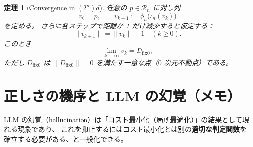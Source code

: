 \documentclass[12pt,a4paper]{article}
\newcommand{\dfix}{D_{\mathrm{fix}0}} %
\newcommand{\Rep}{\mathcal{R}}
\newtheorem{theorem}{定理}[section]
\begin{document}
\begin{theorem}[Convergence in $(2^{n})d$]
任意の $p\in\Rep_{n}$ に対し列
\[
  v_{0}=p,\qquad v_{k+1}:=\phi_{n}\bigl(\iota_{n}(v_{k})\bigr)
\]
を定める。
さらに各ステップで距離が 1 だけ減少すると仮定する：
\[
  \|v_{k+1}\|=\|v_{k}\|-1\quad(k\ge0).
\]
このとき
\[
  \lim_{k\to\infty}v_{k}=\dfix,
\]
ただし $\dfix$ は $\|\dfix\|=0$ を満たす一意な点（$0$ 次元不動点）である。
\end{theorem}

\section{正しさの機序と LLM の幻覚（メモ）}
LLM の幻覚（hallucination）は「コスト最小化（局所最適化）」の結果として現れる現象であり、
これを抑止するにはコスト最小化とは別の\textbf{適切な判定関数}を確立する必要がある、と一般化できる。
\end{document}
